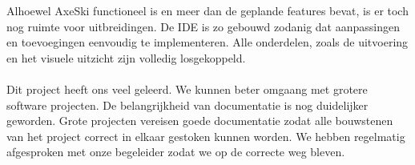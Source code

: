 \documentclass[]{article}
\begin{document}
Alhoewel AxeSki functioneel is en meer dan de geplande features bevat, is er toch nog ruimte voor uitbreidingen. De IDE is zo gebouwd zodanig dat aanpassingen en toevoegingen eenvoudig te implementeren. Alle onderdelen, zoals de uitvoering en het visuele uitzicht zijn volledig losgekoppeld.\\\\
Dit project heeft ons veel geleerd. We kunnen beter omgaang met grotere software projecten. De belangrijkheid van documentatie is nog duidelijker geworden. Grote projecten vereisen goede documentatie zodat alle bouwstenen van het project correct in elkaar gestoken kunnen worden. We hebben regelmatig afgesproken met onze begeleider zodat we op de correcte weg bleven.
\end{document}
